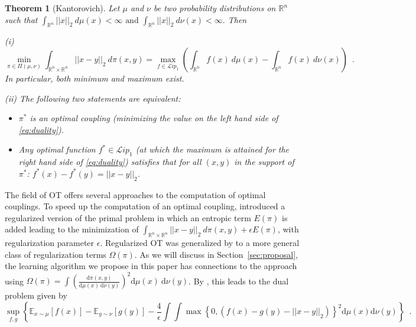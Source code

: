 \documentclass{article} %
\newcommand{\RR}[1][]{\mathbb{R}^{#1}}
\newcommand{\norm}[1]{||{#1}||_2}
\newcommand{\Li}[1]{\mathcal{L}ip_{#1}}
\newcommand{\EE}[2]{\mathbb{E}_{x\sim #2}[{#1}]}
\newtheorem{theorem}{Theorem}
\begin{document}
 
\begin{theorem}[Kantorovich]\label{thm:Kantorovich}
Let $\mu$ and $\nu$ be two probability distributions on $\RR[n]$ such that $\int_{\RR[n]}\norm{x}\ d\mu(x)<\infty\text{ and } \int_{\RR[n]}\norm{x}\ d\nu(x)<\infty.$ Then

(i)
\vspace{-0.5cm}
\begin{equation} \label{eq:duality}
\min_{\pi \in \Pi(\mu,\nu)} \int_{\RR[n]\times\RR[n]} \norm{x-y}\ d\pi(x,y)%
= \max_{f \in \Li{1}} \left ( \int_{\RR[n]} f(x)\ d\mu(x) - \int_{\RR[n]} f(x)\ d\nu(x)\right ) \enspace.
\end{equation}
 In particular, both minimum and maximum exist.

(ii)
%
The following two statements are equivalent:
\begin{itemize}
\item[(a)] $\pi^*$ is an optimal coupling (minimizing 
the value on the left hand side of \eqref{eq:duality}).
\item[(b)] Any optimal function $f^*\in \Li{1}$ (at which the  maximum is attained for the right hand side of \eqref{eq:duality}) satisfies that for all $(x,y)$ in the support of $\pi^*$:  
$f^*(x)-f^*(y) = ||x-y||_2 $.
\end{itemize}
\end{theorem}

The field of OT offers several approaches to the computation of optimal couplings. To speed up the computation of an optimal coupling, \citet{Cuturi} introduced a
regularized 
version of the primal problem 
in which 
an entropic term $E(\pi)$ is added leading to the minimization of  
$\int_{\RR[n]\times\RR[n]} \norm{x-y}\ d\pi(x,y)+ \epsilon E(\pi)$, with regularization parameter $\epsilon$. Regularized OT was generalized by \citet{regulOTRotMover} to a more general class of regularization terms $\Omega(\pi)$. 
As we will discuss in  Section~\ref{sec:proposal},
the learning algorithm we propose in this paper has connections to the approach using $\Omega(\pi)=\int \left ( \frac{ \text{d}\pi(x,y)}{\text{d}\mu(x)\ \text{d}\nu(y)} \right )^2 \text{d}\mu(x)\ \text{d}\nu(y)$. By \citet{Blondel}, this leads to the dual problem given by 
\begin{equation}\label{eq:dualRegOT}
\sup_{f,g} \left \{ \mathbb{E}_{x\sim \mu}[f(x)] - \mathbb{E}_{y\sim \nu}[g(y)]-\frac{4}{\epsilon} \int \int \max \left \{ 0 , \left ( f(x) -g(y) - \norm{x-y}  \right ) \right \}^2 \text{d}\mu(x)\text{d}\nu(y)\right \} \enspace.
\end{equation}
\end{document}
